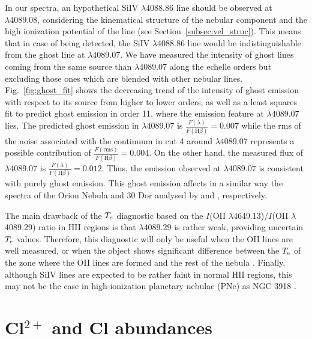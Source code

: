 \documentclass[fleqn,usenatbib]{mnras}
\begin{document}
In our spectra, an hypothetical \mbox{Si}\thinspace \mbox{IV} $\lambda 4088.86$ line should be observed at $\lambda 4089.08$, considering the kinematical structure of the nebular component and the high ionization potential of the line (see Section~\ref{subsec:vel_struc}). This means that in case of being detected, the \mbox{Si}\thinspace \mbox{IV} $\lambda 4088.86$ line would be indistinguishable from the ghost line at $\lambda 4089.07$. We have measured the intensity of ghost lines coming from the same source than $\lambda 4089.07$ along the echelle orders but excluding those ones which are blended with other nebular lines. Fig.~\ref{fig:ghost_fit} shows the decreasing trend of the intensity of ghost emission with respect to its source from higher to lower orders, as well as a least squares fit to predict ghost emission in order 11, where the emission feature at $\lambda 4089.07$ lies. The predicted ghost emission in $\lambda 4089.07$ is $\frac{F(\lambda)}{F(\text{H}\beta)} = 0.007$ while the rms of the noise associated with the continuum in cut 4 around $\lambda 4089.07$ represents a possible contribution of $\frac{F(\text{rms})}{F(\text{H}\beta)} = 0.004$. On the other hand, the measured flux of $\lambda 4089.07$ is $\frac{F(\lambda)}{F(\text{H}\beta)} = 0.012$. Thus, the emission observed at $\lambda 4089.07$ is consistent with purely ghost emission. This ghost emission affects in a similar way the spectra of the Orion Nebula and 30 Dor analysed by \citet{Esteban04} and \citet{Peimbert03}, respectively.

The main drawback of the $T_{\rm e}$ diagnostic based on the $I$(\mbox{O}\thinspace \mbox{II} $\lambda$4649.13)/$I$(\mbox{O}\thinspace \mbox{II} $\lambda$4089.29) ratio in H\thinspace II regions is that $\lambda 4089.29$ is rather weak, providing uncertain $T_{\rm e}$ values. Therefore, this diagnostic  will only be useful when the \mbox{O}\thinspace \mbox{II} lines are well measured, or when the object shows significant difference between the $T_{\rm e}$ of the zone where the \mbox{O}\thinspace \mbox{II} lines are formed and the rest of the nebula \citep{wesson18}. 
Finally, although \mbox{Si}\thinspace \mbox{IV} lines  are expected to be rather faint in normal H\thinspace II regions, this may not be the case in high-ionization planetary nebulae (PNe) as NGC 3918 \citep{garciarojas15}.




\section{Cl$^{2+}$ and Cl abundances}
\label{sec:cl_comment}
\end{document}
